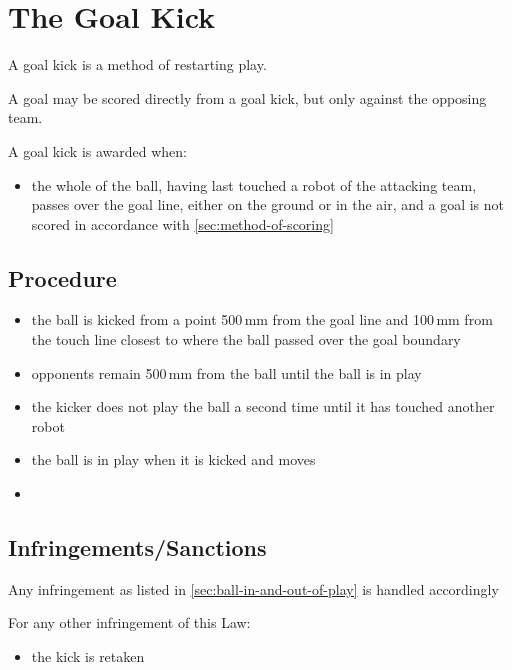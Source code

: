 \section{The Goal Kick}\label{sec:goal-kick}

A goal kick is a method of restarting play.

A goal may be scored directly from a goal kick, but only against the opposing team.

A goal kick is awarded when:

\begin{itemize}
\item the whole of the ball, having last touched a robot of the attacking team, passes over the goal line, either on the ground or in the air, and a goal is not scored in accordance with \autoref{sec:method-of-scoring}
\end{itemize}

\subsection{Procedure}
\begin{itemize}
\item the ball is kicked from a point 500\,mm from the goal line and 100\,mm from the touch line closest to where the ball passed over the goal boundary
\item opponents remain 500\,mm from the ball until the ball is in play
\item the kicker does not play the ball a second time until it has touched another robot
\item the ball is in play when it is kicked and moves
\item {}
\end{itemize}

\subsection{Infringements/Sanctions}
Any infringement as listed in \autoref{sec:ball-in-and-out-of-play} is handled accordingly

For any other infringement of this Law:
\begin{itemize}
\item the kick is retaken
\end{itemize}
